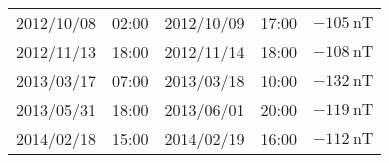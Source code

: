 \begin{table}[h]
\begin{tabular}{ccccc}
	2012/10/08 & 02:00 & 2012/10/09 & 17:00 & $ \SI{-105}{\nano\tesla}$ \\
	2012/11/13 & 18:00 & 2012/11/14 & 18:00 & $ \SI{-108}{\nano\tesla}$ \\
	2013/03/17 & 07:00 & 2013/03/18 & 10:00 & $ \SI{-132}{\nano\tesla}$ \\
	2013/05/31 & 18:00 & 2013/06/01 & 20:00 & $ \SI{-119}{\nano\tesla}$ \\
	2014/02/18 & 15:00 & 2014/02/19 & 16:00 & $ \SI{-112}{\nano\tesla}$ \\ \hline
	\end{tabular}%
	\end{table}

	


%
%